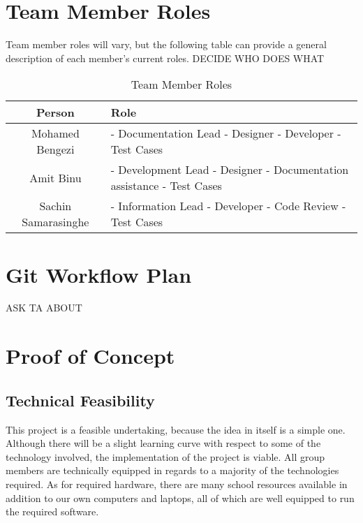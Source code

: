 \documentclass[12pt]{article}
\begin{document}
\section{Team Member Roles}
Team member roles will vary, but the following table can provide a general description of each member's current roles. DECIDE 
WHO DOES WHAT
\begin{table}[h]
\begin{center}
\begin{tabular}{ | c | p{65mm} |  }
\hline
 Person & Role  \\ 
\hline
Mohamed Bengezi & - Documentation Lead \newline - Designer \newline - Developer \newline - Test Cases  \\  
\hline
 Amit Binu & - Development Lead \newline - Designer \newline - Documentation assistance \newline - Test Cases  \\
\hline
 Sachin Samarasinghe & - Information Lead \newline - Developer \newline - Code Review \newline - Test Cases
\\
\hline 
\end{tabular}
\end{center}
\caption{Team Member Roles}
\end{table}

\newpage
\section{Git Workflow Plan}
ASK TA ABOUT

\newpage
\section{Proof of Concept}
\subsection{Technical Feasibility}
This project is a feasible undertaking, because the idea in itself is a simple one. Although there will be a slight learning curve with respect to some of the technology involved, the implementation of the project is viable. All group members are technically equipped in regards to a majority of the technologies required. As for required hardware, there are many school resources available in addition to our own computers and laptops, all of which are well equipped to run the required software. 
\end{document}
